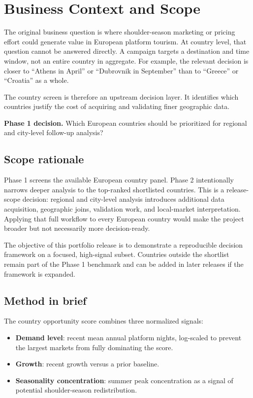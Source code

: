 \section{Business Context and Scope}

The original business question is where shoulder-season marketing or pricing effort could generate value in European platform tourism. At country level, that question cannot be answered directly. A campaign targets a destination and time window, not an entire country in aggregate. For example, the relevant decision is closer to ``Athens in April'' or ``Dubrovnik in September'' than to ``Greece'' or ``Croatia'' as a whole.

The country screen is therefore an upstream decision layer. It identifies which countries justify the cost of acquiring and validating finer geographic data.

\begin{decision}
\textbf{Phase 1 decision.} Which European countries should be prioritized for regional and city-level follow-up analysis?
\end{decision}

\subsection{Scope rationale}

Phase 1 screens the available European country panel. Phase 2 intentionally narrows deeper analysis to the top-ranked shortlisted countries. This is a release-scope decision: regional and city-level analysis introduces additional data acquisition, geographic joins, validation work, and local-market interpretation. Applying that full workflow to every European country would make the project broader but not necessarily more decision-ready.

The objective of this portfolio release is to demonstrate a reproducible decision framework on a focused, high-signal subset. Countries outside the shortlist remain part of the Phase 1 benchmark and can be added in later releases if the framework is expanded.

\subsection{Method in brief}

The country opportunity score combines three normalized signals:

\begin{itemize}
  \item \textbf{Demand level}: recent mean annual platform nights, log-scaled to prevent the largest markets from fully dominating the score.
  \item \textbf{Growth}: recent growth versus a prior baseline.
  \item \textbf{Seasonality concentration}: summer peak concentration as a signal of potential shoulder-season redistribution.
\end{itemize}


